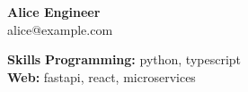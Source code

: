 \documentclass[10pt]{article}
\begin{document}
\begin{center}
    {\LARGE \textbf{Alice Engineer}} \\
    alice@example.com
\end{center}

\textbf{Skills}
\textbf{Programming:} python, typescript\\
\textbf{Web:} fastapi, react, microservices\\
\end{document}
